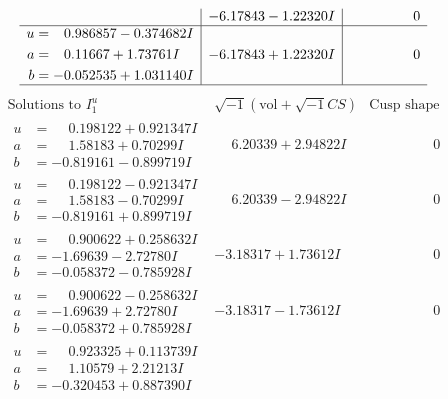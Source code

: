 \documentclass[1p]{elsarticle_modified}
\theoremstyle{definition}
\newcommand{\I}{\sqrt{-1}}
\begin{document}
$$\begin{array}{c|c|c}
 & -6.17843 - 1.22320 I & \phantom{-0.000000 } 0 \\ \hline\begin{aligned}
u &= \phantom{-}0.986857 - 0.374682 I \\
a &= \phantom{-}0.11667 + 1.73761 I \\
b &= -0.052535 + 1.031140 I\end{aligned}
 & -6.17843 + 1.22320 I & \phantom{-0.000000 } 0\\
 \hline 
 \end{array}$$\newpage$$\begin{array}{c|c|c}  
\text{Solutions to }I^u_{1}& \I (\text{vol} + \sqrt{-1}CS) & \text{Cusp shape}\\
 \hline 
\begin{aligned}
u &= \phantom{-}0.198122 + 0.921347 I \\
a &= \phantom{-}1.58183 + 0.70299 I \\
b &= -0.819161 - 0.899719 I\end{aligned}
 & \phantom{-}6.20339 + 2.94822 I & \phantom{-0.000000 } 0 \\ \hline\begin{aligned}
u &= \phantom{-}0.198122 - 0.921347 I \\
a &= \phantom{-}1.58183 - 0.70299 I \\
b &= -0.819161 + 0.899719 I\end{aligned}
 & \phantom{-}6.20339 - 2.94822 I & \phantom{-0.000000 } 0 \\ \hline\begin{aligned}
u &= \phantom{-}0.900622 + 0.258632 I \\
a &= -1.69639 - 2.72780 I \\
b &= -0.058372 - 0.785928 I\end{aligned}
 & -3.18317 + 1.73612 I & \phantom{-0.000000 } 0 \\ \hline\begin{aligned}
u &= \phantom{-}0.900622 - 0.258632 I \\
a &= -1.69639 + 2.72780 I \\
b &= -0.058372 + 0.785928 I\end{aligned}
 & -3.18317 - 1.73612 I & \phantom{-0.000000 } 0 \\ \hline\begin{aligned}
u &= \phantom{-}0.923325 + 0.113739 I \\
a &= \phantom{-}1.10579 + 2.21213 I \\
b &= -0.320453 + 0.887390 I\end{aligned}

\end{array}$$
\end{document}
